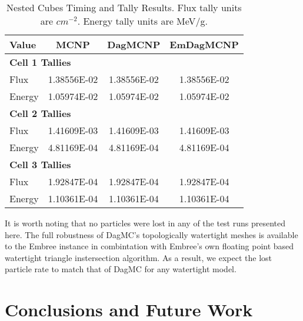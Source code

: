 \documentclass{anstrans}
\begin{document}
\begin{table}

  \begin{center}
    \caption{Nested Cubes Timing and Tally Results. Flux tally units are $cm^{-2}$. Energy tally units are MeV/g.  }
    
    \begin{tabular}{lccc}
      \toprule
      Value & MCNP & DagMCNP & EmDagMCNP \\
      \toprule
      \multicolumn{4}{l}{\textbf{Cell 1 Tallies}} \\
      \hline
      Flux  & 1.38556E-02 & 1.38556E-02 & 1.38556E-02 \\
      Energy  & 1.05974E-02 & 1.05974E-02 & 1.05974E-02 \\
      \hline
      \multicolumn{4}{l}{\textbf{Cell 2 Tallies}} \\
      \hline
      Flux  & 1.41609E-03 & 1.41609E-03 & 1.41609E-03 \\
      Energy  & 4.81169E-04 & 4.81169E-04 & 4.81169E-04 \\
      \hline
      \multicolumn{4}{l}{\textbf{Cell 3 Tallies}} \\
      \hline
      Flux  & 1.92847E-04 & 1.92847E-04 & 1.92847E-04 \\
      Energy  & 1.10361E-04 & 1.10361E-04 & 1.10361E-04 \\
      \bottomrule
      
                        
    \end{tabular}


  \end{center}
\end{table}

It is worth noting that no particles were lost in any of the test runs presented here. The full robustness of DagMC's topologically watertight meshes \cite{make_watertight_smith_2010} is available to the Embree instance in combintation with Embree's own floating point based watertight triangle instersection algorithm. \cite{watertight_tri_intersection_woop_2013} As a result, we expect the lost particle rate to match that of DagMC for any watertight model. 

\section{Conclusions and Future Work}
\end{document}
